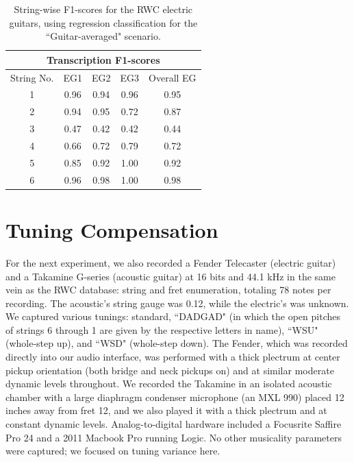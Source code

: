 \documentclass[12pt]{cmuthesis}
\begin{document}
\begin{table}[!htbp]
\begin{center}
\begin{tabular}{||c||c|c|c|c||}
\hline
\multicolumn{5}{||c||}{\bf{Transcription F1-scores}} \\
\hline
String No. & EG1 & EG2 & EG3 & Overall EG\\
\hline
1 & 0.96 & 0.94 & 0.96 & 0.95 \\
\hline
2 & 0.94 & 0.95 & 0.72 & 0.87\\
\hline
3 & 0.47 & 0.42 & 0.42 &  0.44\\
\hline
4 & 0.66 & 0.72 & 0.79 &  0.72\\
\hline
5 & 0.85 & 0.92 & 1.00 &  0.92 \\
\hline
6 & 0.96 & 0.98 & 1.00 &  0.98 \\ 
\hline
\hline
\end{tabular}
\caption{String-wise F1-scores for the RWC electric guitars, using regression classification for the ``Guitar-averaged" scenario.} 
\label{tab:eg-str-f}
\end{center}
\end{table}

\section{Tuning Compensation}
For the next experiment, we also recorded a Fender Telecaster (electric guitar) and a Takamine G-series (acoustic guitar) at 16 bits and 44.1 kHz in the same vein as the RWC database: string and fret enumeration, totaling 78 notes per recording. The acoustic's string gauge was 0.12, while the electric's was unknown. We captured various tunings: standard, ``DADGAD" (in which the open pitches of strings 6 through 1 are given by the respective letters in name), ``WSU" (whole-step up), and ``WSD" (whole-step down). The Fender, which was recorded directly into our audio interface, was performed with a thick plectrum at center pickup orientation (both bridge and neck pickups on) and at similar moderate dynamic levels throughout. We recorded the Takamine in an isolated acoustic chamber with a large diaphragm condenser microphone (an MXL 990) placed 12 inches away from fret 12, and we also played it with a thick plectrum and at constant dynamic levels. Analog-to-digital hardware included a Focusrite Saffire Pro 24 and a 2011 Macbook Pro running Logic. No other musicality parameters were captured; we focused on tuning variance here.
\end{document}
